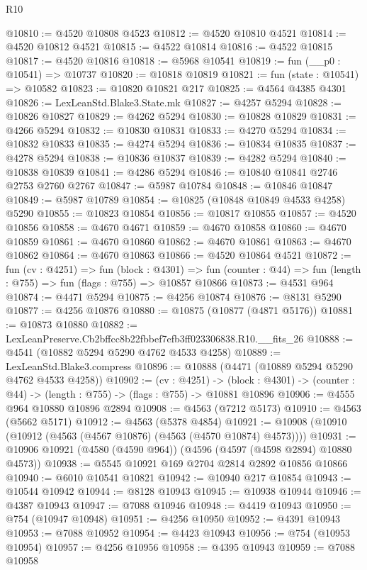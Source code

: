 \begin{lexlean}{R10}
\begin{coremodule}
@10810 := @4520 @10808 @4523
@10812 := @4520 @10810 @4521
@10814 := @4520 @10812 @4521
@10815 := @4522 @10814
@10816 := @4522 @10815
@10817 := @4520 @10816
@10818 := @5968 @10541
@10819 := fun (__p0 : @10541) => @10737
@10820 := @10818 @10819
@10821 := fun (state : @10541) => @10582
@10823 := @10820 @10821 @217
@10825 := @4564 @4385 @4301
@10826 := LexLeanStd.Blake3.State.mk
@10827 := @4257 @5294
@10828 := @10826 @10827
@10829 := @4262 @5294
@10830 := @10828 @10829
@10831 := @4266 @5294
@10832 := @10830 @10831
@10833 := @4270 @5294
@10834 := @10832 @10833
@10835 := @4274 @5294
@10836 := @10834 @10835
@10837 := @4278 @5294
@10838 := @10836 @10837
@10839 := @4282 @5294
@10840 := @10838 @10839
@10841 := @4286 @5294
@10846 := @10840 @10841 @2746 @2753 @2760 @2767
@10847 := @5987 @10784
@10848 := @10846 @10847
@10849 := @5987 @10789
@10854 := @10825 (@10848 @10849 @4533 @4258) @5290
@10855 := @10823 @10854
@10856 := @10817 @10855
@10857 := @4520 @10856
@10858 := @4670 @4671
@10859 := @4670 @10858
@10860 := @4670 @10859
@10861 := @4670 @10860
@10862 := @4670 @10861
@10863 := @4670 @10862
@10864 := @4670 @10863
@10866 := @4520 @10864 @4521
@10872 := fun (cv : @4251) =>
  fun (block : @4301) =>
  fun (counter : @44) => fun (length : @755) => fun (flags : @755) => @10857 @10866
@10873 := @4531 @964
@10874 := @4471 @5294
@10875 := @4256 @10874
@10876 := @8131 @5290
@10877 := @4256 @10876
@10880 := @10875 (@10877 (@4871 @5176))
@10881 := @10873 @10880
@10882 := LexLeanPreserve.Cb2bffcc8b22fbbef7efb3ff023306838.R10.__fits_26
@10888 := @4541 (@10882 @5294 @5290 @4762 @4533 @4258)
@10889 := LexLeanStd.Blake3.compress
@10896 := @10888 (@4471 (@10889 @5294 @5290 @4762 @4533 @4258))
@10902 := (cv : @4251) ->
  (block : @4301) -> (counter : @44) -> (length : @755) -> (flags : @755) -> @10881 @10896
@10906 := @4555 @964 @10880 @10896 @2894
@10908 := @4563 (@7212 @5173)
@10910 := @4563 (@5662 @5171)
@10912 := @4563 (@5378 @4854)
@10921 := @10908 (@10910 (@10912 (@4563 (@4567 @10876) (@4563 (@4570 @10874) @4573))))
@10931 := @10906 @10921 (@4580 (@4590 @964)) (@4596 (@4597 (@4598 @2894) @10880 @4573))
@10938 := @5545 @10921 @169 @2704 @2814 @2892 @10856 @10866
@10940 := @6010 @10541 @10821
@10942 := @10940 @217 @10854
@10943 := @10544 @10942
@10944 := @8128 @10943
@10945 := @10938 @10944
@10946 := @4387 @10943
@10947 := @7088 @10946
@10948 := @4419 @10943
@10950 := @754 (@10947 @10948)
@10951 := @4256 @10950
@10952 := @4391 @10943
@10953 := @7088 @10952
@10954 := @4423 @10943
@10956 := @754 (@10953 @10954)
@10957 := @4256 @10956
@10958 := @4395 @10943
@10959 := @7088 @10958

\end{coremodule}
\end{lexlean}
